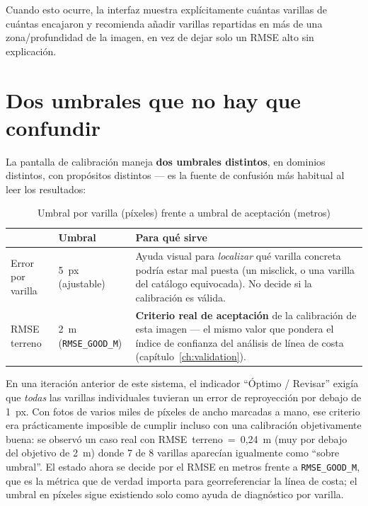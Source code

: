 Cuando esto ocurre, la interfaz muestra explícitamente cuántas varillas de cuántas encajaron y
recomienda añadir varillas repartidas en más de una zona/profundidad de la imagen, en vez de
dejar solo un RMSE alto sin explicación.

\section{Dos umbrales que no hay que confundir}
\label{sec:dos-umbrales}

La pantalla de calibración maneja \textbf{dos umbrales distintos}, en dominios distintos, con
propósitos distintos — es la fuente de confusión más habitual al leer los resultados:

\begin{table}[H]
\centering
\caption{Umbral por varilla (píxeles) frente a umbral de aceptación (metros)}
\label{tab:dos-umbrales}
\begin{tabularx}{\textwidth}{L{3.2cm} C{2.6cm} X}
\toprule
\textbf{} & \textbf{Umbral} & \textbf{Para qué sirve} \\
\midrule
Error por varilla & 5~px (ajustable) & Ayuda visual para \emph{localizar} qué varilla concreta
  podría estar mal puesta (un misclick, o una varilla del catálogo equivocada). No decide si la
  calibración es válida. \\
\addlinespace
RMSE terreno & 2~m (\texttt{RMSE\_GOOD\_M}) & \textbf{Criterio real de aceptación} de la
  calibración de esta imagen — el mismo valor que pondera el índice de confianza del análisis
  de línea de costa (capítulo~\ref{ch:validation}). \\
\bottomrule
\end{tabularx}
\end{table}

\begin{warnbox}
En una iteración anterior de este sistema, el indicador ``Óptimo / Revisar'' exigía que
\emph{todas} las varillas individuales tuvieran un error de reproyección por debajo de 1~px.
Con fotos de varios miles de píxeles de ancho marcadas a mano, ese criterio era prácticamente
imposible de cumplir incluso con una calibración objetivamente buena: se observó un caso real
con RMSE~terreno~=~0,24~m (muy por debajo del objetivo de 2~m) donde 7 de 8 varillas aparecían
igualmente como ``sobre umbral''. El estado ahora se decide por el RMSE en metros frente a
\texttt{RMSE\_GOOD\_M}, que es la métrica que de verdad importa para georreferenciar la línea
de costa; el umbral en píxeles sigue existiendo solo como ayuda de diagnóstico por varilla.
\end{warnbox}

